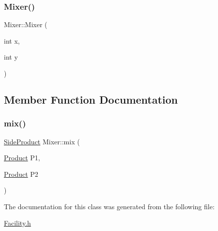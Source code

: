 \subsubsection{\texorpdfstring{Mixer()}{Mixer()}}
{\footnotesize\ttfamily Mixer\+::\+Mixer (\begin{DoxyParamCaption}\item[{int}]{x,  }\item[{int}]{y }\end{DoxyParamCaption})}



\subsection{Member Function Documentation}
\mbox{\label{classMixer_a9352a81375709063c7473e3951f51214}} 
\subsubsection{\texorpdfstring{mix()}{mix()}}
{\footnotesize\ttfamily \mbox{\hyperlink{classSideProduct}{Side\+Product}} Mixer\+::mix (\begin{DoxyParamCaption}\item[{\mbox{\hyperlink{classProduct}{Product}}}]{P1,  }\item[{\mbox{\hyperlink{classProduct}{Product}}}]{P2 }\end{DoxyParamCaption})}



The documentation for this class was generated from the following file\+:\begin{DoxyCompactItemize}
\item 
\mbox{\hyperlink{Facility_8h}{Facility.\+h}}\end{DoxyCompactItemize}
